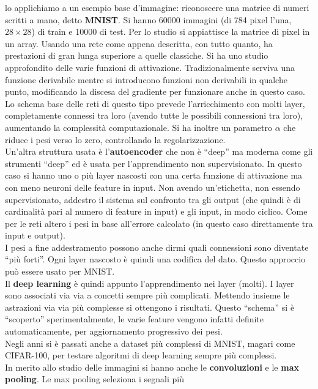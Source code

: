 lo applichiamo a un esempio base d'immagine: riconoscere una matrice di
numeri scritti a mano, detto \textbf{MNIST}. Si hanno 60000 immagini (di 784
pixel l'una, $28\times28$) di train e 10000 di test. Per lo studio si
appiattisce la matrice di pixel in un array. Usando una rete come appena
descritta, con tutto quanto, ha prestazioni di gran lunga superiore a quelle
classiche. Si ha uno studio approfondito delle varie funzioni di
attivazione. Tradizionalmente serviva una funzione derivabile mentre si
introducono funzioni non derivabili in qualche punto, modificando la discesa del
gradiente per funzionare anche in questo caso.\\
Lo schema base delle reti di questo tipo prevede l'arricchimento con molti
layer, completamente connessi tra loro (avendo tutte le possibili connessioni
tra loro), aumentando la complessità computazionale. Si ha inoltre un parametro
$\alpha$ che riduce i pesi verso lo zero, controllando la regolarizzazione.\\
Un'altra struttura usata è l'\textbf{autoencoder} che non è ``deep'' ma moderna
come gli strumenti ``deep'' ed è usata per l'apprendimento non
supervisionato. In questo caso si hanno uno o più layer nascosti con una certa
funzione di attivazione ma con meno neuroni delle feature in input. Non avendo
un'etichetta, non essendo supervisionato, addestro il sistema sul confronto tra
gli output (che quindi è di cardinalità pari al numero di feature in input) e
gli input, in modo ciclico. Come per le reti altero i pesi in base all'errore
calcolato (in questo caso direttamente tra input e output).\\
I pesi a fine addestramento possono anche dirmi quali connessioni sono diventate
``più forti''. Ogni layer nascosto è quindi una codifica del dato.
Questo approccio può essere usato per MNIST.\\
Il \textbf{deep learning} è quindi appunto l'apprendimento nei layer (molti). I
layer sono associati via via a concetti sempre più complicati. Mettendo insieme
le astrazioni via via più complesse si ottengono i risultati. Questo ``schema''
si è ``scoperto'' sperimentalmente, le varie feature vengono infatti definite
automaticamente, per aggiornamento progressivo dei pesi. \\
Negli anni si è passati anche a dataset più complessi di MNIST, magari come
CIFAR-100, per testare algoritmi di deep learning sempre più complessi.\\
In merito allo studio delle immagini si hanno anche le \textbf{convoluzioni} e
le \textbf{max pooling}. Le max pooling seleziona i segnali più
